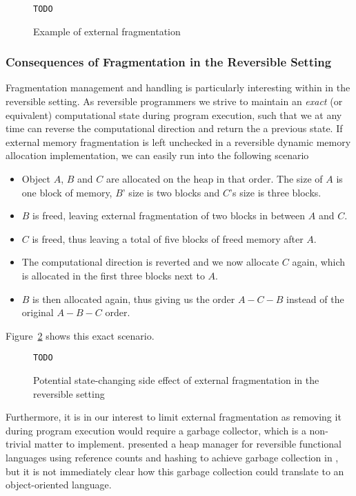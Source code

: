 \begin{figure}[ht]
\centering
\texttt{TODO}
\caption{Example of external fragmentation}
\label{fig:external-frag-example}
\end{figure}

\subsubsection{Consequences of Fragmentation in the Reversible Setting}
Fragmentation management and handling is particularly interesting within in the reversible setting. As reversible programmers we strive to maintain an \textit{exact} (or equivalent) computational state during program execution, such that we at any time can reverse the computational direction and return the a previous state. If external memory fragmentation is left unchecked in a reversible dynamic memory allocation implementation, we can easily run into the following scenario

\begin{itemize}
\item Object $A$, $B$ and $C$ are allocated on the heap in that order. The size of $A$ is one block of memory, $B$' size is two blocks and $C$'s size is three blocks.
\item $B$ is freed, leaving external fragmentation of two blocks in between $A$ and $C$.
\item $C$ is freed, thus leaving a total of five blocks of freed memory after $A$.
\item The computational direction is reverted and we now allocate $C$ again, which is allocated in the first three blocks next to $A$.
\item $B$ is then allocated again, thus giving us the order $A-C-B$ instead of the original $A-B-C$ order.
\end{itemize}  

Figure~\ref{fig:external-frag-comp-state-conseq} shows this exact scenario.

\begin{figure}[ht]
\centering
\texttt{TODO}
\caption{Potential state-changing side effect of external fragmentation in the reversible setting}
\label{fig:external-frag-comp-state-conseq}
\end{figure}

Furthermore, it is in our interest to limit external fragmentation as removing it during program execution would require a garbage collector, which is a non-trivial matter to implement. \citeauthor{tm:garbage} presented a heap manager for reversible functional languages using reference counts and hashing to achieve garbage collection in \cite{tm:garbage}, but it is not immediately clear how this garbage collection could translate to an object-oriented language.

